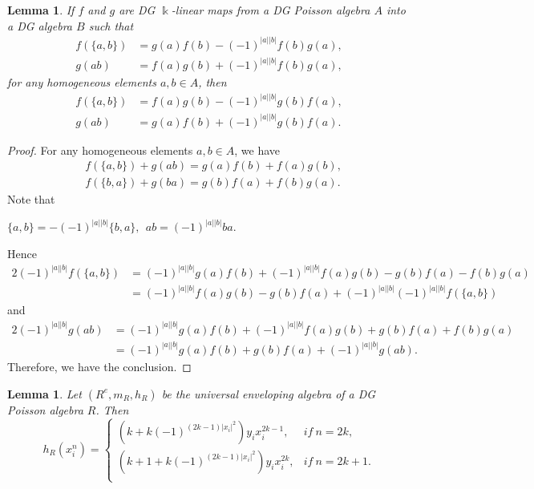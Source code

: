 \documentclass[a4paper,10pt]{amsart}
\newtheorem{lemma}[theorem]{Lemma}
\theoremstyle{definition}
\theoremstyle{remark}
\numberwithin{equation}{section}
\begin{document}
\begin{lemma}\label{lem9}
If $f$ and $g$ are DG $\Bbbk$-linear maps from a DG Poisson algebra
$A$ into a DG algebra $B$ such that
\begin{align*}
f(\{a, b\})&=g(a)f(b)-(-1)^{|a||b|}f(b)g(a),\\
g(ab)&=f(a)g(b)+(-1)^{|a||b|}f(b)g(a),
\end{align*}
for any homogeneous elements $a, b\in A$, then
\begin{align*}
f(\{a, b\})&=f(a)g(b)-(-1)^{|a||b|}g(b)f(a),\\
g(ab)&=g(a)f(b)+(-1)^{|a||b|}g(b)f(a).
\end{align*}
\end{lemma}

\begin{proof}
For any homogeneous elements $a, b\in A$, we have
\begin{align*}
&f(\{a, b\})+g(ab)=g(a)f(b)+f(a)g(b),\\
&f(\{b, a\})+g(ba)=g(b)f(a)+f(b)g(a).
\end{align*}
Note that
\begin{center}
$\{a, b\}=-(-1)^{|a||b|}\{b, a\}, ~~ab=(-1)^{|a||b|}ba$.
\end{center}
 Hence
\begin{align*}
2(-1)^{|a||b|}f(\{a,
b\})&=(-1)^{|a||b|}g(a)f(b)+(-1)^{|a||b|}f(a)g(b)-g(b)f(a)-f(b)g(a)\\
&=(-1)^{|a||b|}f(a)g(b)-g(b)f(a)+(-1)^{|a||b|}(-1)^{|a||b|}f(\{a,
b\})
\end{align*}
and
\begin{align*}
2(-1)^{|a||b|}g(ab)&=(-1)^{|a||b|}g(a)f(b)+(-1)^{|a||b|}f(a)g(b)+g(b)f(a)+f(b)g(a)\\
&=(-1)^{|a||b|}g(a)f(b)+g(b)f(a)+(-1)^{|a||b|}g(ab).
\end{align*}
Therefore, we have the conclusion.
\end{proof}

\begin{lemma}\label{lem10}
Let $(R^{e}, m_R, h_R)$ be the universal enveloping algebra of a DG
Poisson algebra $R$. Then
\begin{equation}
h_R(x_i^{n})=
   \begin{cases}
   (k+k(-1)^{(2k-1)|x_i|^2})y_ix_i^{2k-1}, &if~n=2k,\\
   (k+1+k(-1)^{(2k-1)|x_i|^2})y_ix_i^{2k}, &if~n=2k+1.\\
   \end{cases}
\end{equation}
\end{lemma}
\end{document}
